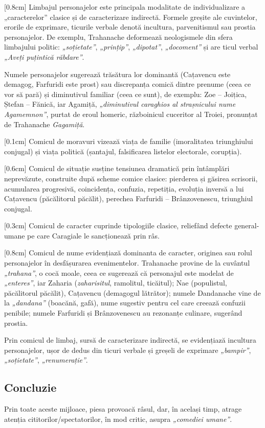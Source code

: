 [0.8cm]
Limbajul personajelor este principala modalitate de individualizare a „caracterelor” clasice și de caracterizare indirectă. Formele greșite ale cuvintelor, erorile de exprimare, ticurile verbale denotă incultura, parvenitismul sau prostia personajelor. De exemplu, Trahanache deformează neologismele din sfera limbajului politic: \textit{„soțietate”}, \textit{„prințip”}, \textit{„dipotat”}, \textit{„docoment”} și are ticul verbal \textit{„Aveți puțintică răbdare”}.

Numele personajelor sugerează trăsătura lor dominantă (Cațavencu este demagog, Farfuridi este prost) sau discrepanța comică dintre prenume (ceea ce vor să pară) și diminutivul familiar (ceea ce sunt), de exemplu: Zoe -- Joițica, Ștefan -- Fănică, iar Agamiță, \textit{„diminutivul caraghios al strașnicului nume Agamemnon”}, purtat de eroul homeric, războinicul cuceritor al Troiei, pronunțat de Trahanache \textit{Gagamiță}.

[0.1cm]
Comicul de moravuri vizează viața de familie (imoralitatea triunghiului conjugal) și viața politică (șantajul, falsificarea listelor electorale, corupția).

[0.6cm]
Comicul de situație susține tensiunea dramatică prin întâmplări neprevăzute, construite după scheme comice clasice: pierderea și găsirea scrisorii, acumularea progresivă, coincidența, confuzia, repetiția, evoluția inversă a lui Cațavencu (păcălitorul păcălit), perechea Farfuridi -- Brânzovenescu, triunghiul conjugal.

[0.3cm]
Comicul de caracter cuprinde tipologiile clasice, reliefând defecte general-umane pe care Caragiale le sancționează prin râs.

[0.8cm]
Comicul de nume evidențiază dominanta de caracter, originea sau rolul personajelor în desfășurarea evenimentelor. Trahanache provine de la cuvântul \textit{„trahana”}, o cocă moale, ceea ce sugerează că personajul este modelat de \textit{„enteres”}, iar Zaharia (\textit{zaharisitul}, ramolitul, ticăitul); Nae (populistul, păcălitorul păcălit), Cațavencu (demagogul lătrător); numele Dandanache vine de la \textit{„dandana”} (boacănă, gafă), nume sugestiv pentru cel care creează confuzii penibile; numele Farfuridi și Brânzovenescu au rezonanțe culinare, sugerând prostia.

Prin comicul de limbaj, sursă de caracterizare indirectă, se evidențiază incultura personajelor, ușor de dedus din ticuri verbale și greșeli de exprimare \textit{„bampir”}, \textit{„soțietate”}, \textit{„renumerație”}.


\subsection{Concluzie}

Prin toate aceste mijloace, piesa provoacă râsul, dar, în același timp, atrage atenția cititorilor/spectatorilor, în mod critic, asupra \textit{„comediei umane”}.
